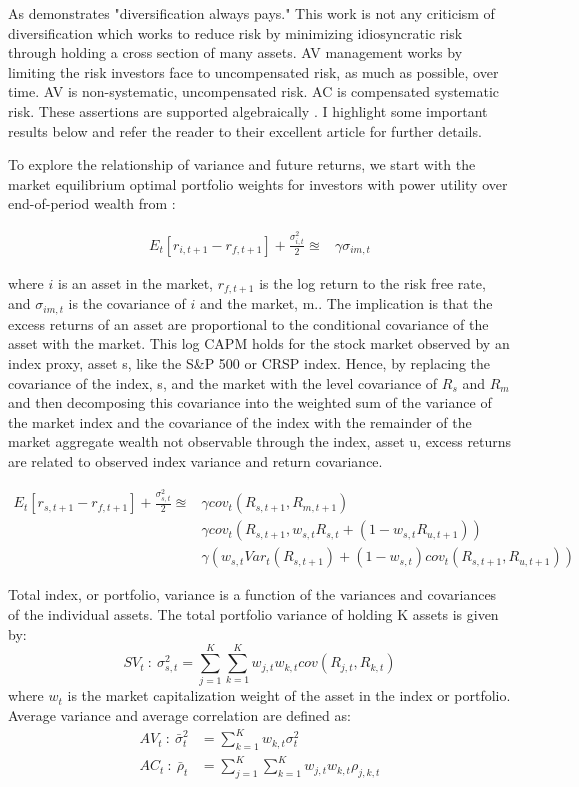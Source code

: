 As \citet{samuelson_general_1967} demonstrates "diversification always pays." This work is not any criticism of diversification which works to reduce risk by minimizing idiosyncratic risk through holding a cross section of many assets. AV management works by limiting the risk investors face to uncompensated risk, as much as possible, over time. AV is non-systematic, uncompensated risk. AC is compensated systematic risk. These assertions are supported algebraically \citet{pollet_average_2010}. I highlight some important results below and refer the reader to their excellent article for further details. 

To explore the relationship of variance and future returns, we start with the market equilibrium optimal portfolio weights for investors with power utility over end-of-period wealth from \citet{noauthor_strategic_nodate}:

\begin{align*}
E_{t}[r_{i,t+1}-r_{f,t+1}] + \frac{\sigma^{2}_{i,t}}{2} \approxeq& \gamma \sigma_{im,t}
\end{align*}

where $i$ is an asset in the market, $r_{f,t+1}$ is the log return to the risk free rate, and $\sigma_{im,t}$ is the covariance of $i$ and the market, m.. The implication is that the excess returns of an asset are proportional to the conditional covariance of the asset with the market. This log CAPM holds for the stock market observed by an index proxy, asset s, like the S\&P 500 or CRSP index. Hence, by replacing the covariance of the index, s, and the market with the level covariance of $R_{s}$ and $R_{m}$ and then decomposing this covariance into the weighted sum of the variance of the market index and the covariance of the index with the remainder of the market aggregate wealth not observable through the index, asset u, excess returns are related to observed index variance and return covariance.

\begin{align*}
E_{t}[r_{s,t+1}-r_{f,t+1}] + \frac{\sigma^{2}_{s,t}}{2} \approxeq& \gamma cov_{t}(R_{s,t+1},R_{m,t+1})\\
& \gamma cov_{t}(R_{s,t+1},w_{s,t}R_{s,t}+(1-w_{s,t}R_{u,t+1}))\\
& \gamma (w_{s,t}Var_{t}(R_{s,t+1})+(1-w_{s,t})cov_{t}(R_{s,t+1},R_{u,t+1}))
\end{align*}

Total index, or portfolio, variance is a function of the variances and covariances of the individual assets. The total portfolio variance of holding K assets is given by:
\begin{equation}
SV_{t} ~:~ \sigma^{2}_{s,t} =  \sum_{j=1}^{K}\sum_{k=1}^{K}w_{j,t}w_{k,t}cov(R_{j,t},R_{k,t})
\end{equation}
where $w_{t}$ is the market capitalization weight of the asset in the index or portfolio. Average variance and average correlation are defined as:
\begin{align}
AV_{t} ~:~ \bar{\sigma}^{2}_{t} &= \sum_{k=1}^{K}w_{k,t}\sigma^{2}_{t}\\
AC_{t} ~:~ \bar{\rho}_{t} &= \sum_{j=1}^{K}\sum_{k=1}^{K}w_{j,t}w_{k,t}\rho_{j,k,t}
\end{align}

